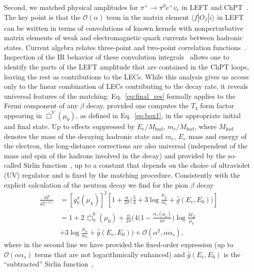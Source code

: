 \documentclass[prl,twocolumn,twoside,preprintnumbers,superscriptaddress,nofootinbib,letterpaper]{revtex4-1}
\newcommand{\Order}{\mathcal{O}}
\newcommand{\Mhad}{M_\text{had}}
\begin{document}
Second, we matched physical amplitudes
for $\pi^+ \to \pi^0 e^+ \nu_e$ in LEFT and ChPT~\cite{Supp}.
The key point is that the $\Order(\alpha)$ term in the matrix element $\langle f | O_\beta | i \rangle$  in LEFT
can be written in terms of convolutions of known kernels
with  nonperturbative matrix elements of  weak and electromagnetic quark currents between hadronic states.
Current algebra relates three-point and two-point correlation functions~\cite{Abers:1968zz,Sirlin:1977sv}.
Inspection of the IR behavior of these convolution integrals~\cite{Abers:1968zz,Sirlin:1967zz}
allows one to identify the parts of the LEFT amplitude that are  contained in the ChPT loops,
leaving the rest as contributions to the LECs.
While this  analysis gives us access only to the linear combination of LECs contributing to the decay rate,
it  reveals   universal features of the matching:
Eq.~\eqref{eq:final_res}  formally applies to the  Fermi component of any $\beta$ decay,
provided one computes the $T_3$ form factor appearing in
$\bar\Box^V (\mu_0)$, as defined in Eq.~\eqref{eq:box1}, in the appropriate initial and final state.
Up to effects suppressed by $E_e/\Mhad$, $m_e/\Mhad$, where $\Mhad$ denotes
the mass of the decaying hadronic  state
and $m_e$, $E_e$ mass and energy of the electron, the long-distance corrections
are also universal (independent of the mass and spin of the hadrons involved in the decay) and provided
by the so-called Sirlin function~\cite{Sirlin:1967zz},
up to a constant  that depends on the choice of ultraviolet (UV) regulator and is fixed by the matching procedure.
Consistently with the explicit calculation of the neutron decay
\cite{Cirigliano:2022hob,Cirigliano:2023fnz} we find for the pion $\beta$ decay
\begin{align}
\frac{d \Gamma}{d \Gamma^{(0)} } & =  [g_V^\pi (\mu_\chi)]^2
\left[ 1 + \frac{\alpha}{2 \pi} \bigg( \frac{5}{4}  + 3 \log \frac{\mu_\chi}{m_e} + \hat g(E_e, E_0)   \bigg) \right]
\nonumber \\
& = 1 + 2 \, \bar\Box^V_\pi(\mu_0)
+ \frac{\alpha}{2 \pi} \bigg(
4 \Big(1-\frac{\alpha_s(\mu_0)}{4\pi}\Big)\log\frac{M_Z}{\mu_0}
\nonumber \\
&+ 3 \log \frac{\mu_0}{m_e} + \hat g(E_e, E_0)  \bigg) +
\Order(\alpha^2, \alpha \alpha_s) ,
\label{eq:rate0}
\end{align}
where in the second line we have provided the fixed-order expression
(up to $\Order (\alpha \alpha_s)$ terms that are not logarithmically enhanced)
and  $\hat g(E_e,E_0)$ is the ``subtracted'' Sirlin function~\cite{Sirlin:1967zz},
\end{document}
